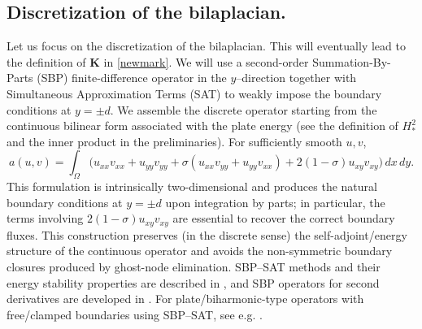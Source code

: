 \documentclass[12pt]{article}
\numberwithin{equation}{section}
\begin{document}
\subsection{Discretization of the bilaplacian.}
Let us focus on the discretization of the bilaplacian. This will eventually lead to the definition of $\boldsymbol{K}$ in \eqref{newmark}. We will use a second-order Summation-By-Parts (SBP) finite-difference operator in the $y$--direction together with Simultaneous
Approximation Terms (SAT) to weakly impose the boundary conditions at $y=\pm d$.  We assemble the discrete operator starting from the continuous bilinear form
associated with the plate energy (see the definition of $H_*^2$ and the inner
product in the preliminaries). For sufficiently smooth $u,v$,
\[
a(u,v)=\int_{\Omega}\Big(
u_{xx}v_{xx}+u_{yy}v_{yy}
+\sigma(u_{xx}v_{yy}+u_{yy}v_{xx})
+2(1-\sigma)u_{xy}v_{xy}
\Big)\,dx\,dy.
\]
This formulation is intrinsically two-dimensional and produces the natural
boundary conditions at $y=\pm d$ upon integration by parts; in particular, the
terms involving $2(1-\sigma)u_{xy}v_{xy}$ are essential to recover the correct
boundary fluxes. This construction preserves (in the discrete sense) the self-adjoint/energy structure of the continuous operator and avoids the non-symmetric boundary closures produced by ghost-node elimination. SBP--SAT methods and their energy stability properties are described in \cite{Fernandez2014review,Carpenter1999}, and SBP operators for second derivatives are developed in \cite{Mattsson2004}. For plate/biharmonic-type operators with free/clamped boundaries using SBP--SAT, see e.g. \cite{Tazhimbetov2023}. \\
\end{document}
